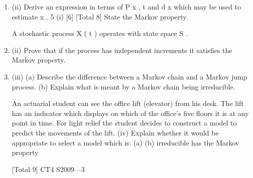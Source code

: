 \documentclass[a4paper,12pt]{article}
\begin{document}
\begin{enumerate}

[Total 7]4
(i)
In the context of mortality investigations describe the principle of
correspondence and give an example of a situation in which it may be hard to
adhere to this principle.

On 1 January 2005 a country introduced a comprehensive system of death
registration, which classified deaths by age last birthday on the date of death.
The government of the country wishes to obtain estimates of the force of mortality,
\mu x , by single years of age x for the period between 1 January 2005 and 1 January
2008. Annual population censuses have been taken on 30 June each year since 2004,
which classify the population by age last birthday. However the only copy of the data
from the population census of 30 June 2006 was lost when the computer disc on
which it was stored was being transferred between government departments.
Let the population aged x last birthday on 30 June in year t be denoted by the symbol
P x , t , and the number of deaths during the period of investigation of persons aged x be
denoted by the symbol d x .
\item (ii)
Derive an expression in terms of P x , t and d x which may be used to estimate
\mu x .
5
(i)
[6]
[Total 8]
State the Markov property.

A stochastic process X ( t ) operates with state space S .
\item (ii) Prove that if the process has independent increments it satisfies the Markov
property.

\item (iii) (a)
Describe the difference between a Markov chain and a Markov jump
process.
(b)
Explain what is meant by a Markov chain being irreducible.

An actuarial student can see the office lift (elevator) from his desk. The lift has an
indicator which displays on which of the office’s five floors it is at any point in time.
For light relief the student decides to construct a model to predict the movements of
the lift.
(iv)
Explain whether it would be appropriate to select a model which is:
(a)
(b)
irreducible
has the Markov property

[Total 9]
CT4 S2009—3


\end{enumerate}
\end{document}
